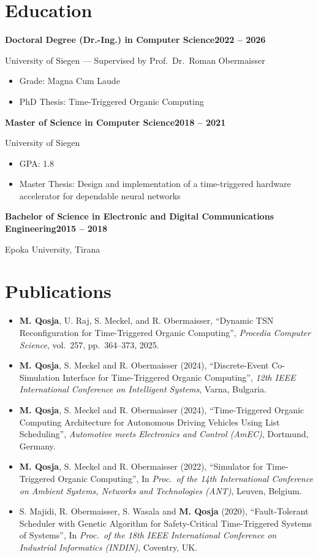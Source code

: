 \documentclass[10pt,a4paper]{article}
\newcommand{\eduentry}[3]{%
  \textbf{#1}\hfill\textbf{#2}\par
  #3\par
}
\begin{document}
\section{Education}

\eduentry{Doctoral Degree (Dr.-Ing.) in Computer Science}{2022 -- 2026}{University of Siegen --- Supervised by Prof.\ Dr.\ Roman Obermaisser}
\begin{itemize}
  \item Grade: Magna Cum Laude
  \item PhD Thesis: Time-Triggered Organic Computing
\end{itemize}

\vspace{0.4em}
\eduentry{Master of Science in Computer Science}{2018 -- 2021}{University of Siegen}
\begin{itemize}
  \item GPA: 1.8
  \item Master Thesis: Design and implementation of a time-triggered hardware accelerator for dependable neural networks
\end{itemize}

\vspace{0.4em}
\eduentry{Bachelor of Science in Electronic and Digital Communications Engineering}{2015 -- 2018}{Epoka University, Tirana}

\section{Publications}
\begin{itemize}[itemsep=4pt]
  \item \textbf{M. Qosja}, U. Raj, S. Meckel, and R. Obermaisser, ``Dynamic TSN Reconfiguration for Time-Triggered Organic Computing'', \textit{Procedia Computer Science}, vol.\ 257, pp.\ 364--373, 2025.
  \item \textbf{M. Qosja}, S. Meckel and R. Obermaisser (2024), ``Discrete-Event Co-Simulation Interface for Time-Triggered Organic Computing'', \textit{12th IEEE International Conference on Intelligent Systems}, Varna, Bulgaria.
  \item \textbf{M. Qosja}, S. Meckel and R. Obermaisser (2024), ``Time-Triggered Organic Computing Architecture for Autonomous Driving Vehicles Using List Scheduling'', \textit{Automotive meets Electronics and Control (AmEC)}, Dortmund, Germany.
  \item \textbf{M. Qosja}, S. Meckel and R. Obermaisser (2022), ``Simulator for Time-Triggered Organic Computing'', In \textit{Proc.\ of the 14th International Conference on Ambient Systems, Networks and Technologies (ANT)}, Leuven, Belgium.
  \item S. Majidi, R. Obermaisser, S. Wasala and \textbf{M. Qosja} (2020), ``Fault-Tolerant Scheduler with Genetic Algorithm for Safety-Critical Time-Triggered Systems of Systems'', In \textit{Proc.\ of the 18th IEEE International Conference on Industrial Informatics (INDIN)}, Coventry, UK.
\end{itemize}
\end{document}
